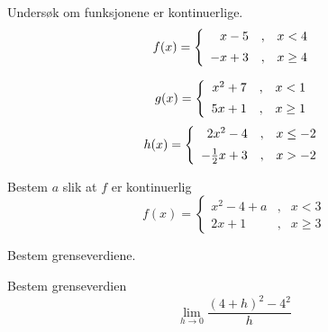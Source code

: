 





\opgt


\nes

Undersøk om funksjonene er kontinuerlige.
\begin{equation*}
	f(x)= \left\lbrace{
		\begin{array}{rcr}
			x-5 &,&x<4 \br
			-x+3   &,& x\geq 4
		\end{array}
	}\right. 
\end{equation*}

\begin{equation*}
	g(x)= \left\lbrace{
		\begin{array}{rcr}
			x^2+7 &,&x<1 \br
			5x+1   &,& x\geq 1
		\end{array}
	}\right. 
\end{equation*}
\begin{equation*}
	h(x)= \left\lbrace{
		\begin{array}{rcr}
			2x^2-4 &,& x\leq -2 \br
			-\frac{1}{2}x+3   &,& x>-2 
		\end{array}
	}\right. 
\end{equation*}

Bestem $ a $ slik at $ f $ er kontinuerlig
\begin{equation*}
	f(x)= \left\lbrace{
		\begin{array}{rcr}
			x^2 - 4 + a &,& x < 3 \\
			2x + 1 & ,& x \geq 3
		\end{array}
	}\right. 
\end{equation*}

Bestem grenseverdiene. \os
{} \os
{}

Bestem grenseverdien
\[ \lim\limits_{h\to 0} \frac{(4+h)^2-4^2}{h}\]

